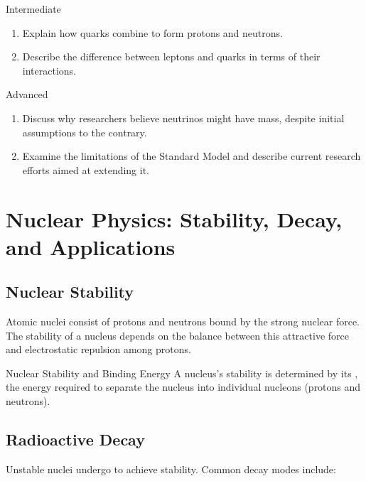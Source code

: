 \begin{tieredquestions}{Intermediate}
\begin{enumerate}
    \item Explain how quarks combine to form protons and neutrons.
    \item Describe the difference between leptons and quarks in terms of their interactions.
\end{enumerate}
\end{tieredquestions}

\begin{tieredquestions}{Advanced}
\begin{enumerate}
    \item Discuss why researchers believe neutrinos might have mass, despite initial assumptions to the contrary.
    \item Examine the limitations of the Standard Model and describe current research efforts aimed at extending it.
\end{enumerate}
\end{tieredquestions}

\FloatBarrier

\section{Nuclear Physics: Stability, Decay, and Applications}
\FloatBarrier

\subsection{Nuclear Stability}
\FloatBarrier

Atomic nuclei consist of protons and neutrons bound by the strong nuclear force. The stability of a nucleus depends on the balance between this attractive force and electrostatic repulsion among protons.

\begin{keyconcept}{Nuclear Stability and Binding Energy}
A nucleus's stability is determined by its , the energy required to separate the nucleus into individual nucleons (protons and neutrons).
\end{keyconcept}

\subsection{Radioactive Decay}
\FloatBarrier

Unstable nuclei undergo  to achieve stability. Common decay modes include:

